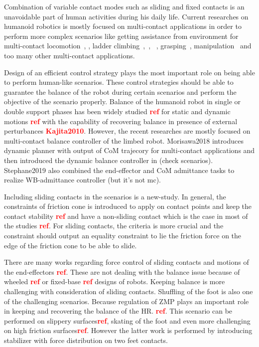 \documentclass[letterpaper, 10pt, conference]{ieeeconf}
\begin{document}
Combination of variable contact modes such as sliding and fixed contacts is an unavoidable part of human activities during his daily life. 
Current researches on humanoid robotics is mostly focused on multi-contact applications in order to perform more complex scenarios like getting assistance from environment for multi-contact locomotion~\cite{Reher2020Springer}, \cite{Kumagai2019Humanoids}, ladder climbing~\cite{Vaillant2015Humanoids},~\cite{Nozawa2016Humanoids},~\cite{Vaillant2016Springer} , grasping~\cite{Collette2008icra}, manipulation~\cite{Garcia-Haro2019Humanoids} and too many other multi-contact applications.


Design of an efficient control strategy plays the most important role on being able to perform human-like scenarios.
These control strategies should be able to guarantee the balance of the robot during certain scenarios and perform the objective of the scenario properly. Balance of the humanoid robot in single or double support phases has been widely studied \textcolor{red}{\textbf{ref}} for static and dynamic motions \textcolor{red}{\textbf{ref}} with the capability of recovering balance in presence of external perturbances \textcolor{red}{\textbf{Kajita2010}}. However, the recent researches are mostly focused on multi-contact balance controller of the limbed robot. Morisawa2018 introduces dynamic planner with output of CoM trajecory for multi-contact applications and then introduced the dynamic balance controller in (check scenarios). Stephane2019 also combined the end-effector and CoM admittance tasks to realize WB-admittance controller (but it's not mc). 

Including sliding contacts in the scenarios is a new-study. In general, the constraints of friction cone is introduced to apply on contact points and keep the contact stability \textcolor{red}{\textbf{ref}} and have a non-sliding contact which is the case in most of the studies \textcolor{red}{\textbf{ref}}. For sliding contacts, the criteria is more crucial and the constraint should output an equality constraint to lie the friction force on the edge of the friction cone to be able to slide. 

 There are many works regarding force control of sliding contacts and motions of the end-effectors \textcolor{red}{\textbf{ref}}. These are not dealing with the balance issue because of wheeled \textcolor{red}{\textbf{ref}} or fixed-base \textcolor{red}{\textbf{ref}} designs of robots.
 Keeping balance is more challenging with consideration of sliding contacts.
Shuffling of the foot is also one of the challenging scenarios. Because regulation of ZMP plays an important role in keeping and recovering the balance of the HR. \textcolor{red}{\textbf{ref}}. This scenario can be performed on slippery surfaces\textcolor{red}{\textbf{ref}}, skating of the foot and even more challenging on high friction surfaces\textcolor{red}{\textbf{ref}}. However the latter work is performed by introducing stabilizer with force distribution on two feet contacts.
\end{document}
